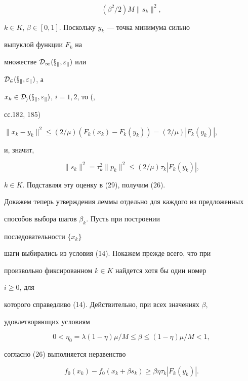 \begin{pf}
\begin{equation}
(\beta^2/2)M\|s_k\|^2,


\end{equation}


$k\in K$, $\beta\in[0,1]$. Поскольку $y_k$ --- точка минимума сильно


выпуклой функции $F_k$ на


множестве $\cal D_1(x_k,\varepsilon_k)$ или


$\cal D_2(x_k,\varepsilon_k)$, а


$x_k\in\cal D_i(x_k,\varepsilon_k)$, $i=1,2$, то (\cite{Vas},


сс.182, 185)


$\|x_k-y_k\|^2\le(2/\mu)(F_k(x_k)-F_k(y_k))=(2/\mu)|F_k(y_k)|$,


и, значит,


\begin{equation}


\|s_k\|^2=\tau^2_k\|p_k\|^2\le(2/\mu)\tau_k|F_k(y_k)|,


\end{equation}


$k\in K$. Подставляя эту оценку в (29), получим (26).





Докажем теперь утверждения леммы отдельно для каждого из предложенных


способов выбора шагов $\beta_k$. Пусть при построении


последовательности $\{x_k\}$


шаги выбирались из условия (14). Покажем прежде всего, что при


произвольно фиксированном $k\in K$ найдется хотя бы один номер


$i\ge 0$, для


которого справедливо (14). Действительно, при всех значениях $\beta$,


удовлетворяющих условиям


\begin{equation}


0<\eta_0=\lambda(1-\eta)\mu/M\le\beta\le(1-\eta)\mu/M<1,


\end{equation}


согласно (26) выполняется неравенство


\begin{equation}


f_0(x_k)-f_0(x_k+\beta s_k)\ge \beta\eta\tau_k|F_k(y_k)|.


\end{equation}



\end{pf}
